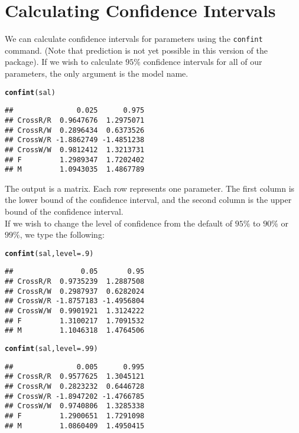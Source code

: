 \documentclass[11pt]{article}\usepackage[]{graphicx}\usepackage[]{color}
\makeatletter
\newcommand{\hlnum}[1]{\textcolor[rgb]{0.686,0.059,0.569}{#1}}%
\newcommand{\hlstd}[1]{\textcolor[rgb]{0.345,0.345,0.345}{#1}}%
\newcommand{\hlkwc}[1]{\textcolor[rgb]{0.333,0.667,0.333}{#1}}%
\newcommand{\hlkwd}[1]{\textcolor[rgb]{0.737,0.353,0.396}{\textbf{#1}}}%
\newenvironment{kframe}{%
 \def\at@end@of@kframe{}%
 \ifinner\ifhmode%
  \def\at@end@of@kframe{\end{minipage}}%
  \begin{minipage}{\columnwidth}%
 \fi\fi%
 \def\FrameCommand##1{\hskip\@totalleftmargin \hskip-\fboxsep
 \colorbox{shadecolor}{##1}\hskip-\fboxsep
     \hskip-\linewidth \hskip-\@totalleftmargin \hskip\columnwidth}%
 \MakeFramed {\advance\hsize-\width
   \@totalleftmargin\z@ \linewidth\hsize
   \@setminipage}}%
 {\par\unskip\endMakeFramed%
 \at@end@of@kframe}
\newenvironment{knitrout}{}{} %
\makeatother
\begin{document}
\section{Calculating Confidence Intervals}\label{sec:ci}
We can calculate confidence intervals for parameters using the \texttt{confint} command. (Note that prediction is not yet possible in this version of the package).  If we wish to calculate $95\%$ confidence intervals for all of our parameters, the only argument is the model name. \\
\begin{knitrout}
\color{fgcolor}\begin{kframe}
\begin{alltt}
\hlkwd{confint}\hlstd{(sal)}
\end{alltt}
\begin{verbatim}
##               0.025      0.975
## CrossR/R  0.9647676  1.2975071
## CrossR/W  0.2896434  0.6373526
## CrossW/R -1.8862749 -1.4851238
## CrossW/W  0.9812412  1.3213731
## F         1.2989347  1.7202402
## M         1.0943035  1.4867789
\end{verbatim}
\end{kframe}
\end{knitrout}
The output is a matrix. Each row represents one parameter. The first column is the lower bound of the confidence interval, and the second column is the upper bound of the confidence interval. \\

If we wish to change the level of confidence from the default of $95\%$ to $90\%$ or $99\%$, we type the following:\\
\begin{knitrout}
\color{fgcolor}\begin{kframe}
\begin{alltt}
\hlkwd{confint}\hlstd{(sal,}\hlkwc{level}\hlstd{=}\hlnum{.9}\hlstd{)}
\end{alltt}
\begin{verbatim}
##                0.05       0.95
## CrossR/R  0.9735239  1.2887508
## CrossR/W  0.2987937  0.6282024
## CrossW/R -1.8757183 -1.4956804
## CrossW/W  0.9901921  1.3124222
## F         1.3100217  1.7091532
## M         1.1046318  1.4764506
\end{verbatim}
\begin{alltt}
\hlkwd{confint}\hlstd{(sal,}\hlkwc{level}\hlstd{=}\hlnum{.99}\hlstd{)}
\end{alltt}
\begin{verbatim}
##               0.005      0.995
## CrossR/R  0.9577625  1.3045121
## CrossR/W  0.2823232  0.6446728
## CrossW/R -1.8947202 -1.4766785
## CrossW/W  0.9740806  1.3285338
## F         1.2900651  1.7291098
## M         1.0860409  1.4950415
\end{verbatim}
\end{kframe}
\end{knitrout}
\end{document}
